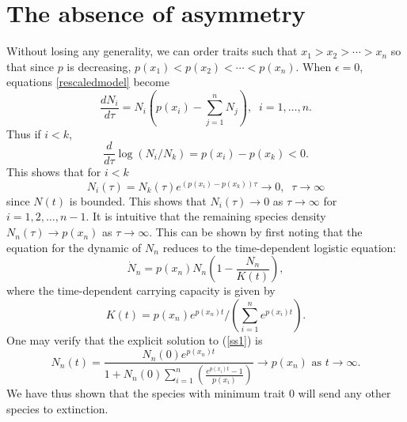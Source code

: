 \section{The absence of asymmetry}
\label{appendix1b}
Without losing any generality, we can order traits such that $x_1>x_2 > \cdots > x_n$ so that since $p$ is decreasing, $p(x_1)< p(x_2) < \cdots < p(x_n)$. When $\epsilon=0$, equations \eqref{rescaledmodel} become
\[
\frac{d N_i}{d\tau}=N_i\left(p(x_i)-\sum_{j=1}^n N_{j}\right), \;\; i=1,\ldots,n.
\]
Thus if $i < k$,
\[
\frac{d}{d\tau} \log (N_i/N_k) = p(x_i)-p(x_k)<0.
\]
This shows that for $i<k$
\[
N_i(\tau) = N_k(\tau) e^{( p(x_i)-p(x_k)) \tau} \rightarrow 0, \;\; \tau\rightarrow \infty
\]
since $N(t)$ is bounded. This shows that $N_{i}(\tau)\rightarrow 0$ as $\tau\rightarrow \infty$ for $i=1,2,\ldots,n-1$. It is intuitive that the remaining species density $N_n(\tau) \rightarrow p(x_n)$ as $\tau\rightarrow \infty$. This can be shown by first noting that the equation for the dynamic of $N_n$ reduces to  the time-dependent logistic equation:
\begin{equation}
\dot{N}_n = p(x_n) N_n \left(1-\frac{N_n}{K(t)}\right), \label{ss1}
\end{equation}
where the time-dependent carrying capacity is given by 
\[
K(t) = p(x_n)e^{p(x_n)t}/(\sum_{i=1}^n e^{p(x_i)t}).
\] One may verify that the explicit solution to (\ref{ss1}) is
\[
N_n(t) = \frac{N_n(0) e^{p(x_n)t}}{1+N_n(0)\sum_{i=1}^n \left( \frac{e^{p(x_i)t}-1}{p(x_i)} \right)}\rightarrow p(x_n)\mbox{ as } t\rightarrow \infty.
\]
We have thus shown that the species with minimum trait $0$ will send any other species to extinction.

